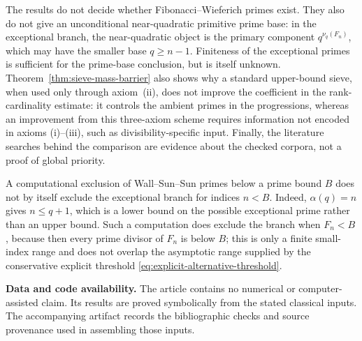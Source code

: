 The results do not decide whether Fibonacci--Wieferich primes exist.  They
also do not give an unconditional near-quadratic primitive prime base: in
the exceptional branch, the near-quadratic object is the primary component
$q^{\nu_q(F_n)}$, which may have the smaller base $q\geq n-1$.  Finiteness
of the exceptional primes is sufficient for the prime-base conclusion, but
is itself unknown.  Theorem~\ref{thm:sieve-mass-barrier} also shows why a
standard upper-bound sieve, when used only through axiom~\textup{(ii)}, does
not improve the coefficient in the rank-cardinality estimate: it controls the
ambient primes in the progressions, whereas an improvement from this
three-axiom scheme requires information not encoded in axioms
\textup{(i)--(iii)}, such as divisibility-specific input.  Finally, the
literature searches behind the comparison
are evidence about the checked corpora, not a proof of global priority.

A computational exclusion of Wall--Sun--Sun primes below a prime bound
$B$ does not by itself exclude the exceptional branch for indices $n<B$.
Indeed, $\alpha(q)=n$ gives $n\leq q+1$, which is a lower bound on the
possible exceptional prime rather than an upper bound.  Such a computation
does exclude the branch when $F_n<B$, because then every prime divisor of
$F_n$ is below $B$; this is only a finite small-index range and does not
overlap the asymptotic range supplied by the conservative explicit
threshold \eqref{eq:explicit-alternative-threshold}.

\medskip
\noindent\textbf{Data and code availability.}
The article contains no numerical or computer-assisted claim.  Its results
are proved symbolically from the stated classical inputs.  The accompanying
artifact records the bibliographic checks and source provenance used in
assembling those inputs.
